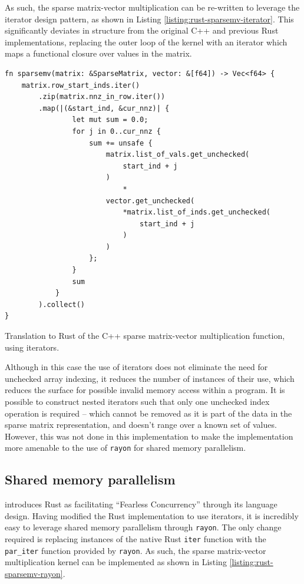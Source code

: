 As such, the sparse matrix-vector multiplication can be re-written to leverage the iterator design pattern, as shown in Listing \ref{listing:rust-sparsemv-iterator}. This significantly deviates in structure from the original C++ and previous Rust implementations, replacing the outer loop of the kernel with an iterator which maps a functional closure over values in the matrix.

\begin{code}
    \begin{verbatim}
fn sparsemv(matrix: &SparseMatrix, vector: &[f64]) -> Vec<f64> {
    matrix.row_start_inds.iter()
        .zip(matrix.nnz_in_row.iter())
        .map(|(&start_ind, &cur_nnz)| {
                let mut sum = 0.0;
                for j in 0..cur_nnz {
                    sum += unsafe {
                        matrix.list_of_vals.get_unchecked(
                            start_ind + j
                        )
                            *
                        vector.get_unchecked(
                            *matrix.list_of_inds.get_unchecked(
                                start_ind + j
                            )
                        )
                    };
                }
                sum
            }
        ).collect()
}
    \end{verbatim}
    \caption{Translation to Rust of the C++ sparse matrix-vector multiplication function, using iterators.}
    \label{listing:rust-sparsemv-iterator}
\end{code}

Although in this case the use of iterators does not eliminate the need for unchecked array indexing, it reduces the number of instances of their use, which reduces the surface for possible invalid memory access within a program. It is possible to construct nested iterators such that only one unchecked index operation is required -- which cannot be removed as it is part of the data in the sparse matrix representation, and doesn't range over a known set of values. However, this was not done in this implementation to make the implementation more amenable to the use of \texttt{rayon} for shared memory parallelism.

\subsection{Shared memory parallelism}
\label{sec:translation-rayon}

 introduces Rust as facilitating ``Fearless Concurrency'' through its language design. Having modified the Rust implementation to use iterators, it is incredibly easy to leverage shared memory parallelism through \texttt{rayon}. The only change required is replacing instances of the native Rust \texttt{iter} function with the \texttt{par\_iter} function provided by \texttt{rayon}. As such, the sparse matrix-vector multiplication kernel can be implemented as shown in Listing \ref{listing:rust-sparsemv-rayon}.

